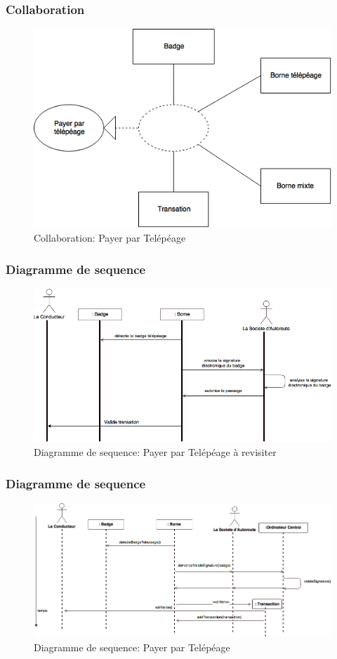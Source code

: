 \subsubsection{Collaboration}
\begin{figure}[h]
    \centering
    \includegraphics[scale=0.55]{02_Desenvolvimento/TD2/images/ColaTelepeage.png}
    \caption{Collaboration: Payer par Telépéage}
\end{figure}
\newpage
\subsubsection{Diagramme de sequence}
\begin{figure}[h]
    \centering
    \includegraphics[scale=0.4]{02_Desenvolvimento/TD2/images/DS-PayerTelepeage.png}
    \caption{Diagramme de sequence: Payer par Telépéage à revisiter }
\end{figure}
\subsubsection{Diagramme de sequence}
\begin{figure}[h]
    \centering
    \includegraphics[scale=0.43]{02_Desenvolvimento/TD2/images/v2-DS-PayerTelepeage.png}
    \caption{Diagramme de sequence: Payer par Telépéage}
\end{figure}

